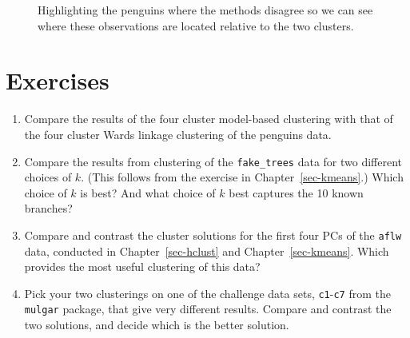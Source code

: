 \documentclass[
  letterpaper,
]{krantz}
\providecommand{\tightlist}{%
  \setlength{\itemsep}{0pt}\setlength{\parskip}{0pt}}\usepackage{longtable,booktabs,array}
\begin{document}
\begin{figure}


\caption{\label{fig-compare-clusters2}Highlighting the penguins where
the methods disagree so we can see where these observations are located
relative to the two clusters.}

\end{figure}%

\section*{Exercises}\label{exercises-11}


\begin{enumerate}
\def\labelenumi{\arabic{enumi}.}
\tightlist
\item
  Compare the results of the four cluster model-based clustering with
  that of the four cluster Wards linkage clustering of the penguins
  data.
\item
  Compare the results from clustering of the \texttt{fake\_trees} data
  for two different choices of \(k\). (This follows from the exercise in
  Chapter~\ref{sec-kmeans}.) Which choice of \(k\) is best? And what
  choice of \(k\) best captures the 10 known branches?
\item
  Compare and contrast the cluster solutions for the first four PCs of
  the \texttt{aflw} data, conducted in Chapter~\ref{sec-hclust} and
  Chapter~\ref{sec-kmeans}. Which provides the most useful clustering of
  this data?
\item
  Pick your two clusterings on one of the challenge data sets,
  \texttt{c1}-\texttt{c7} from the \texttt{mulgar} package, that give
  very different results. Compare and contrast the two solutions, and
  decide which is the better solution.
\end{enumerate}
\end{document}
